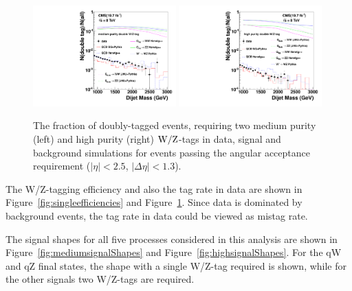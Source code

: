 \begin{figure}[htb]
\begin{center}
\includegraphics[width=0.49\textwidth]{EXO-12-024/figs/signal-acc-eff/double-tagging-eff-medium.pdf}
\includegraphics[width=0.49\textwidth]{EXO-12-024/figs/signal-acc-eff/double-tagging-eff.pdf}
\end{center}
\caption{The fraction of doubly-tagged events, requiring two medium purity (left) 
and high purity (right) ${\rm W}/{\rm Z}$-tags in data,
  signal and background simulations for events passing the angular acceptance
  requirement ($|\eta| < 2.5$, $|\Delta\eta|<1.3$).}
\label{fig:doubleefficiencies}
\end{figure}
%


The W/Z-tagging efficiency and also the tag rate in data are shown in Figure~\ref{fig:singleefficiencies} and Figure~\ref{fig:doubleefficiencies}. Since data is dominated by background events, the tag rate
in data could be viewed as mistag rate. 


The signal shapes for all five processes considered in this analysis are shown in Figure~\ref{fig:mediumsignalShapes} and Figure~\ref{fig:highsignalShapes}.  
For the qW and qZ final states, the shape with a single W/Z-tag required is shown, while for the other signals two W/Z-tags are required.



